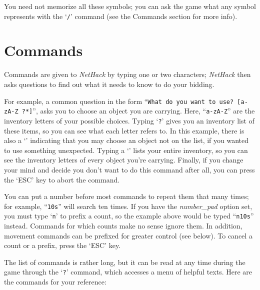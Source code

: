 You need not memorize all these symbols; you can ask the game what any
symbol represents with the `{\tt /}' command (see the Commands section for
more info).
\elist

\section{Commands}

Commands are given to {\it NetHack\/} by typing one or two characters;
{\it NetHack\/} then asks questions to find out what it needs to know to do
your bidding.

For example, a common question in the form ``{\tt What do you want to
use? [a-zA-Z\ ?*]}'', asks you to choose an object you are carrying.
Here, ``{\tt a-zA-Z}'' are the inventory letters of your possible choices.
Typing `{\tt ?}' gives you an inventory list of these items, so you can see
what each letter refers to.  In this example, there is also a `{\tt *}'
indicating that you may choose an object not on the list, if you
wanted to use something unexpected.  Typing a `{\tt *}' lists your entire
inventory, so you can see the inventory letters of every object you're
carrying.  Finally, if you change your mind and decide you don't want
to do this command after all, you can press the `ESC' key to abort the
command.

You can put a number before most commands to repeat them that many
times; for example, ``{\tt 10s}'' will search ten times.  If you have the
{\it number\_pad\/}
option set, you must type `{\tt n}' to prefix a count, so the example above
would be typed ``{\tt n10s}'' instead.  Commands for which counts make no
sense ignore them.  In addition, movement commands can be prefixed for
greater control (see below).  To cancel a count or a prefix, press the
`ESC' key.

The list of commands is rather long, but it can be read at any time
during the game through the `{\tt ?}' command, which accesses a menu of
helpful texts.  Here are the commands for your reference:

